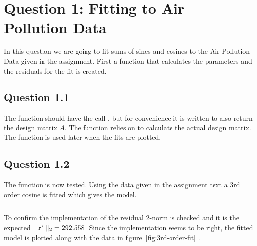 \def\assignmenttitle{Assignment 2}
\def\assignmentdate{08-12-2011}
\def\assignmentnumber{2}





\maketitle


\section*{Question 1: Fitting to Air Pollution Data}

In this question we are going to fit sums of sines and cosines to the Air
Pollution Data given in the assignment. First a function  that
calculates the parameters and the residuals for the fit is created.

\subsection*{Question 1.1}

The function should have the call ,
but for convenience it is written to also return the design matrix $A$. The
function  relies on  to calculate the actual
design matrix. The function  is used later when the fits are
plotted.





\subsection*{Question 1.2}


The  function is now tested. Using the data given in the
assignment text a 3rd order cosine is fitted which gives the model. 

\begin{equation*}
    
\end{equation*}

To confirm the implementation of  the residual 2-norm is checked
and it is the expected $||\,\mathbf{r^*}\,||_2=292.558$. Since the implementation
seems to be right, the fitted model is plotted along with the data in
figure~\ref{fig:3rd-order-fit} .\par

